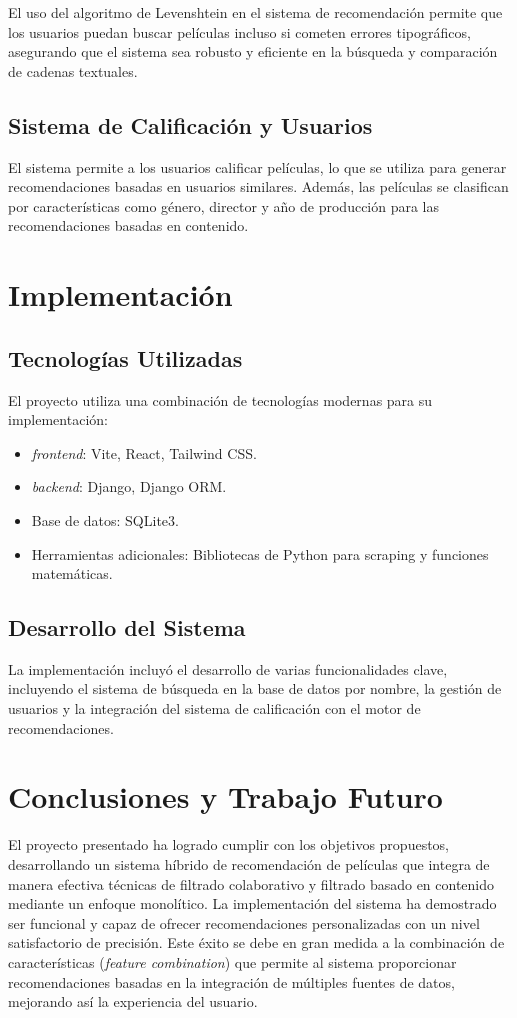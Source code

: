 \documentclass{llncs}
\begin{document}
	
	El uso del algoritmo de Levenshtein en el sistema de recomendación permite que los usuarios puedan buscar películas incluso si cometen errores tipográficos, asegurando que el sistema sea robusto y eficiente en la búsqueda y comparación de cadenas textuales.
	
	\subsection{Sistema de Calificación y Usuarios}
	El sistema permite a los usuarios calificar películas, lo que se utiliza para generar recomendaciones basadas en usuarios similares. Además, las películas se clasifican por características como género, director y año de producción para las recomendaciones basadas en contenido.
	
	\section{Implementación}
	\subsection{Tecnologías Utilizadas}
	El proyecto utiliza una combinación de tecnologías modernas para su implementación:
	\begin{itemize}
		\item 	\textit{frontend}: Vite, React, Tailwind CSS.
		\item 	\textit{backend}: Django, Django ORM.
		\item Base de datos: SQLite3.
		\item Herramientas adicionales: Bibliotecas de Python para scraping y funciones matemáticas.
	\end{itemize}
	
	\subsection{Desarrollo del Sistema}
	La implementación incluyó el desarrollo de varias funcionalidades clave, incluyendo el sistema de búsqueda en la base de datos por nombre, la gestión de usuarios y la integración del sistema de calificación con el motor de recomendaciones.
	
	\section{Conclusiones y Trabajo Futuro}
	El proyecto presentado ha logrado cumplir con los objetivos propuestos, desarrollando un sistema híbrido de recomendación de películas que integra de manera efectiva técnicas de filtrado colaborativo y filtrado basado en contenido mediante un enfoque monolítico. La implementación del sistema ha demostrado ser funcional y capaz de ofrecer recomendaciones personalizadas con un nivel satisfactorio de precisión. Este éxito se debe en gran medida a la combinación de características (\textit{feature combination}) que permite al sistema proporcionar recomendaciones basadas en la integración de múltiples fuentes de datos, mejorando así la experiencia del usuario.
	
\end{document}
